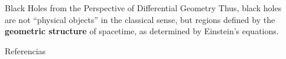 \documentclass[final]{beamer}
\newlength{\sepwidth}
\newlength{\colwidth}
\newcommand{\separatorcolumn}{\begin{column}{\sepwidth}\end{column}}
\begin{document}
\begin{frame}[t]
\begin{columns}[t]
\begin{column}{\colwidth}
\begin{block}{Black Holes from the Perspective of Differential Geometry}
      Thus, black holes are not “physical objects” in the classical sense, but regions defined by the \textbf{geometric structure} of spacetime, as determined by Einstein's equations.
      

  \end{block}


  \begin{block}{Referencias}

    \nocite{*}
    \footnotesize{
      
      
    }

  \end{block}

\end{column}
\separatorcolumn



\end{columns}
\end{frame}
\end{document}
